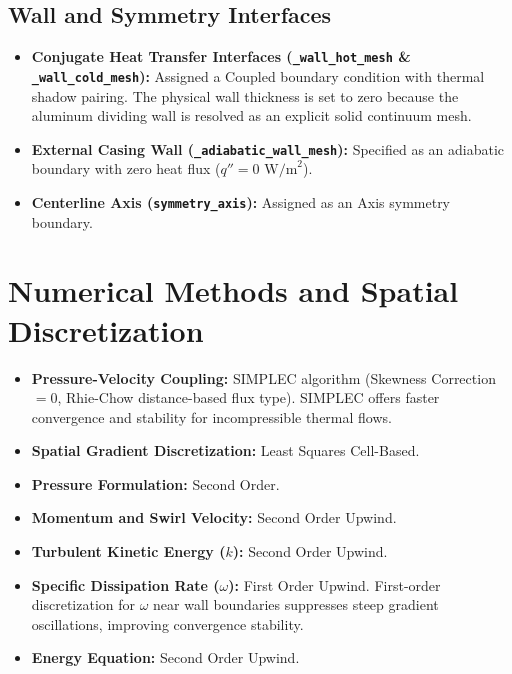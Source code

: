 \documentclass[12pt,a4paper]{report}
\begin{document}
\subsection{Wall and Symmetry Interfaces}
\begin{itemize}
    \item \textbf{Conjugate Heat Transfer Interfaces (\texttt{\_wall\_hot\_mesh} \& \texttt{\_wall\_cold\_mesh}):} Assigned a Coupled boundary condition with thermal shadow pairing. The physical wall thickness is set to zero because the aluminum dividing wall is resolved as an explicit solid continuum mesh.
    \item \textbf{External Casing Wall (\texttt{\_adiabatic\_wall\_mesh}):} Specified as an adiabatic boundary with zero heat flux ($q'' = 0\text{ W/m}^2$).
    \item \textbf{Centerline Axis (\texttt{symmetry\_axis}):} Assigned as an Axis symmetry boundary.
\end{itemize}

\section{Numerical Methods and Spatial Discretization}
\begin{itemize}
    \item \textbf{Pressure-Velocity Coupling:} SIMPLEC algorithm (Skewness Correction $= 0$, Rhie-Chow distance-based flux type). SIMPLEC offers faster convergence and stability for incompressible thermal flows.
    \item \textbf{Spatial Gradient Discretization:} Least Squares Cell-Based.
    \item \textbf{Pressure Formulation:} Second Order.
    \item \textbf{Momentum and Swirl Velocity:} Second Order Upwind.
    \item \textbf{Turbulent Kinetic Energy ($k$):} Second Order Upwind.
    \item \textbf{Specific Dissipation Rate ($\omega$):} First Order Upwind. First-order discretization for $\omega$ near wall boundaries suppresses steep gradient oscillations, improving convergence stability.
    \item \textbf{Energy Equation:} Second Order Upwind.
\end{itemize}
\end{document}
